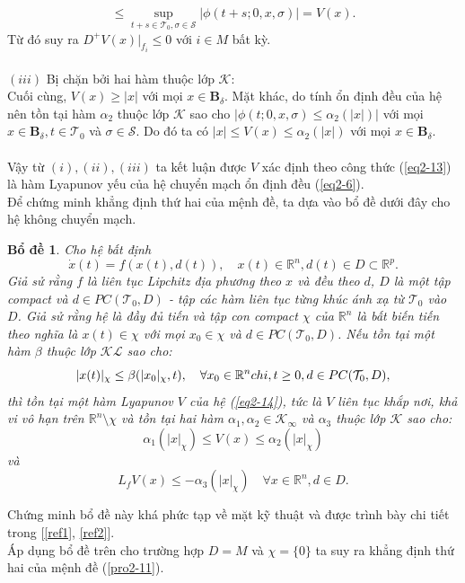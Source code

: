 \documentclass[14pt,a4paper,oneside]{report}		%
\newtheorem{lemma}[theorem]{Bổ đề}
\theoremstyle{definition}
\begin{document}
$$\leq\sup_{t+s\in\mathcal{T}_0,\sigma\in\mathcal{S}}|\phi(t+s;0,x,\sigma)|=V(x).$$
Từ đó suy ra $D^+V(x)|_{f_i}\leq 0$ với $i\in M$ bất kỳ.\\\\
$(iii)$ Bị chặn bởi hai hàm thuộc lớp $\mathcal{K}$:\\
Cuối cùng, $V(x)\geq |x|$ với mọi $x\in\mathbf{B}_\delta$. Mặt khác, do tính ổn định đều của hệ nên tồn tại hàm $\alpha_2$ thuộc lớp $\mathcal{K}$ sao cho $|\phi(t;0,x,\sigma)\leq\alpha_2(|x|)|$ với mọi $x\in\mathbf{B}_\delta, t\in\mathcal{T}_0$ và $\sigma\in\mathcal{S}$. Do đó ta có $|x|\leq V(x)\leq\alpha_2(|x|)$ với mọi $x\in\mathbf{B}_\delta$.\\\\
Vậy từ $(i),(ii),(iii)$ ta kết luận được $V$ xác định theo công thức (\ref{eq2-13}) là hàm Lyapunov yếu của hệ chuyển mạch ổn định đều (\ref{eq2-6}).\\

Để chứng minh khẳng định thứ hai của mệnh đề, ta dựa vào bổ đề dưới đây cho hệ không chuyển mạch.

\begin{lemma}
Cho hệ bất định
\begin{equation} \label{eq2-14}
\dot{x}(t)=f(x(t),d(t)),\quad x(t)\in\mathbb{R}^n,d(t)\in D\subset\mathbb{R}^p.
\end{equation}
Giả sử rằng $f$ là liên tục Lipchitz địa phương theo $x$ và đều theo $d$, $D$ là một tập compact và $d\in PC(\mathcal{T}_0,D)$ - tập các hàm liên tục từng khúc ánh xạ từ $\mathcal{T}_0$ vào $D$. Giả sử rằng hệ là đầy đủ tiến và tập con compact $\chi$ của $\mathbb{R}^n$ là bất biến tiến theo nghĩa là $x(t) \in \chi$ với mọi $x_0\in\chi$ và $d\in PC(\mathcal{T}_0,D)$. Nếu tồn tại một hàm $\beta$ thuộc lớp $\mathcal{KL}$ sao cho:
\begin{equation} \label{eq2-15}
|x(t)|_\chi \leq\beta(|x_0|_\chi,t),\quad\forall x_0\in\mathbb{R}^n\\chi, t\geq 0,d\in PC(\mathcal{T}_0,D),
\end{equation}
thì tồn tại một hàm Lyapunov $V$ của hệ (\ref{eq2-14}), tức là $V$ liên tục khắp nơi, khả vi vô hạn trên $\mathbb{R}^n \setminus \chi$ và tồn tại hai hàm $\alpha_1,\alpha_2\in\mathcal{K}_\infty$ và $\alpha_3$ thuộc lớp $\mathcal{K}$ sao cho:
$$\alpha_1(|x|_\chi)\leq V(x)\leq\alpha_2(|x|_\chi)$$
và
$$L_fV(x)\leq -\alpha_3(|x|_\chi) \quad \forall x\in\mathbb{R}^n,d\in D.$$
\end{lemma}

Chứng minh bổ đề này khá phức tạp về mặt kỹ thuật và được trình bày chi tiết trong [\ref{ref1}, \ref{ref2}].\\
Áp dụng bổ đề trên cho trường hợp $D=M$ và $\chi=\{0\}$ ta suy ra khẳng định thứ hai của mệnh đề (\ref{pro2-11}).\\
\end{document}
